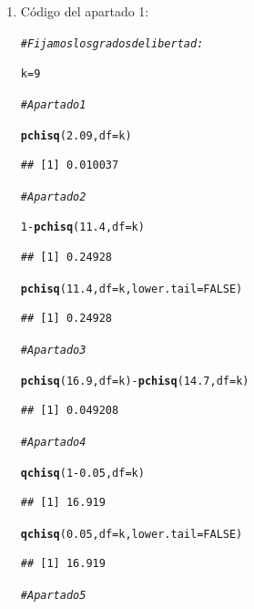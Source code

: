 \documentclass[10pt,a4paper]{article}\usepackage[]{graphicx}\usepackage[]{color}
\makeatletter
\newcommand{\hlnum}[1]{\textcolor[rgb]{0.686,0.059,0.569}{#1}}%
\newcommand{\hlcom}[1]{\textcolor[rgb]{0.678,0.584,0.686}{\textit{#1}}}%
\newcommand{\hlopt}[1]{\textcolor[rgb]{0,0,0}{#1}}%
\newcommand{\hlstd}[1]{\textcolor[rgb]{0.345,0.345,0.345}{#1}}%
\newcommand{\hlkwb}[1]{\textcolor[rgb]{0.69,0.353,0.396}{#1}}%
\newcommand{\hlkwc}[1]{\textcolor[rgb]{0.333,0.667,0.333}{#1}}%
\newcommand{\hlkwd}[1]{\textcolor[rgb]{0.737,0.353,0.396}{\textbf{#1}}}%
\newenvironment{kframe}{%
 \def\at@end@of@kframe{}%
 \ifinner\ifhmode%
  \def\at@end@of@kframe{\end{minipage}}%
  \begin{minipage}{\columnwidth}%
 \fi\fi%
 \def\FrameCommand##1{\hskip\@totalleftmargin \hskip-\fboxsep
 \colorbox{shadecolor}{##1}\hskip-\fboxsep
     \hskip-\linewidth \hskip-\@totalleftmargin \hskip\columnwidth}%
 \MakeFramed {\advance\hsize-\width
   \@totalleftmargin\z@ \linewidth\hsize
   \@setminipage}}%
 {\par\unskip\endMakeFramed%
 \at@end@of@kframe}
\newenvironment{knitrout}{}{} %
\makeatother
\begin{document}
\begin{enumerate}
  \item Código del apartado 1:
\begin{knitrout}
\color{fgcolor}\begin{kframe}
\begin{alltt}
\hlcom{# Fijamos los grados de libertad:}

\hlstd{k} \hlkwb{=} \hlnum{9}

\hlcom{# Apartado 1}

\hlkwd{pchisq}\hlstd{(}\hlnum{2.09}\hlstd{,} \hlkwc{df}\hlstd{=k)}
\end{alltt}
\begin{verbatim}
## [1] 0.010037
\end{verbatim}
\begin{alltt}
\hlcom{# Apartado 2}

\hlnum{1} \hlopt{-} \hlkwd{pchisq}\hlstd{(}\hlnum{11.4}\hlstd{,} \hlkwc{df}\hlstd{=k)}
\end{alltt}
\begin{verbatim}
## [1] 0.24928
\end{verbatim}
\begin{alltt}
\hlkwd{pchisq}\hlstd{(}\hlnum{11.4}\hlstd{,} \hlkwc{df}\hlstd{=k,} \hlkwc{lower.tail}\hlstd{=}\hlnum{FALSE}\hlstd{)}
\end{alltt}
\begin{verbatim}
## [1] 0.24928
\end{verbatim}
\begin{alltt}
\hlcom{# Apartado 3}

\hlkwd{pchisq}\hlstd{(}\hlnum{16.9}\hlstd{,} \hlkwc{df}\hlstd{=k)} \hlopt{-} \hlkwd{pchisq}\hlstd{(}\hlnum{14.7}\hlstd{,} \hlkwc{df}\hlstd{=k)}
\end{alltt}
\begin{verbatim}
## [1] 0.049208
\end{verbatim}
\begin{alltt}
\hlcom{# Apartado 4}

\hlkwd{qchisq}\hlstd{(}\hlnum{1} \hlopt{-} \hlnum{0.05}\hlstd{,} \hlkwc{df}\hlstd{=k)}
\end{alltt}
\begin{verbatim}
## [1] 16.919
\end{verbatim}
\begin{alltt}
\hlkwd{qchisq}\hlstd{(}\hlnum{0.05}\hlstd{,} \hlkwc{df}\hlstd{=k,} \hlkwc{lower.tail}\hlstd{=}\hlnum{FALSE}\hlstd{)}
\end{alltt}
\begin{verbatim}
## [1] 16.919
\end{verbatim}
\begin{alltt}
\hlcom{# Apartado 5}


\end{alltt}
\end{kframe}
\end{knitrout}
\end{enumerate}
\end{document}
